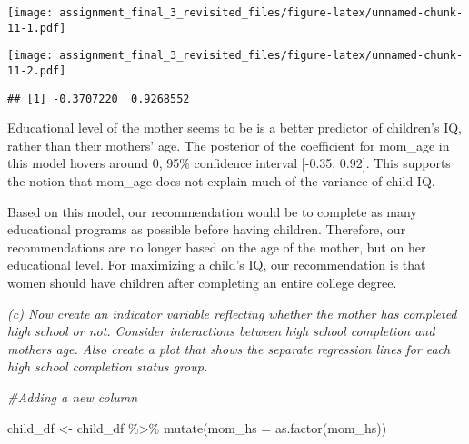 \documentclass[
]{article}
\newenvironment{Shaded}{\begin{snugshade}}{\end{snugshade}}
\newcommand{\AttributeTok}[1]{\textcolor[rgb]{0.77,0.63,0.00}{#1}}
\newcommand{\CommentTok}[1]{\textcolor[rgb]{0.56,0.35,0.01}{\textit{#1}}}
\newcommand{\FunctionTok}[1]{\textcolor[rgb]{0.00,0.00,0.00}{#1}}
\newcommand{\NormalTok}[1]{#1}
\newcommand{\OtherTok}[1]{\textcolor[rgb]{0.56,0.35,0.01}{#1}}
\newcommand{\SpecialCharTok}[1]{\textcolor[rgb]{0.00,0.00,0.00}{#1}}
\newcommand{\StringTok}[1]{\textcolor[rgb]{0.31,0.60,0.02}{#1}}
\begin{document}
\texttt{[image: assignment\_final\_3\_revisited\_files/figure-latex/unnamed-chunk-11-1.pdf]}

\begin{Shaded}
\end{Shaded}

\texttt{[image: assignment\_final\_3\_revisited\_files/figure-latex/unnamed-chunk-11-2.pdf]}

\begin{Shaded}
\end{Shaded}

\begin{verbatim}
## [1] -0.3707220  0.9268552
\end{verbatim}

Educational level of the mother seems to be is a better predictor of
children's IQ, rather than their mothers' age. The posterior of the
coefficient for mom\_age in this model hovers around 0, 95\% confidence
interval {[}-0.35, 0.92{]}. This supports the notion that mom\_age does
not explain much of the variance of child IQ.

Based on this model, our recommendation would be to complete as many
educational programs as possible before having children. Therefore, our
recommendations are no longer based on the age of the mother, but on her
educational level. For maximizing a child's IQ, our recommendation is
that women should have children after completing an entire college
degree.

\emph{(c) Now create an indicator variable reflecting whether the mother
has completed high school or not. Consider interactions between high
school completion and mothers age. Also create a plot that shows the
separate regression lines for each high school completion status group.}

\begin{Shaded}
\begin{Highlighting}[]
\CommentTok{\#Adding a new column }


\NormalTok{child\_df }\OtherTok{\textless{}{-}}\NormalTok{ child\_df }\SpecialCharTok{\%\textgreater{}\%} \FunctionTok{mutate}\NormalTok{(}\AttributeTok{mom\_hs =} \FunctionTok{as.factor}\NormalTok{(mom\_hs))}
\end{Highlighting}
\end{Shaded}
\end{document}
